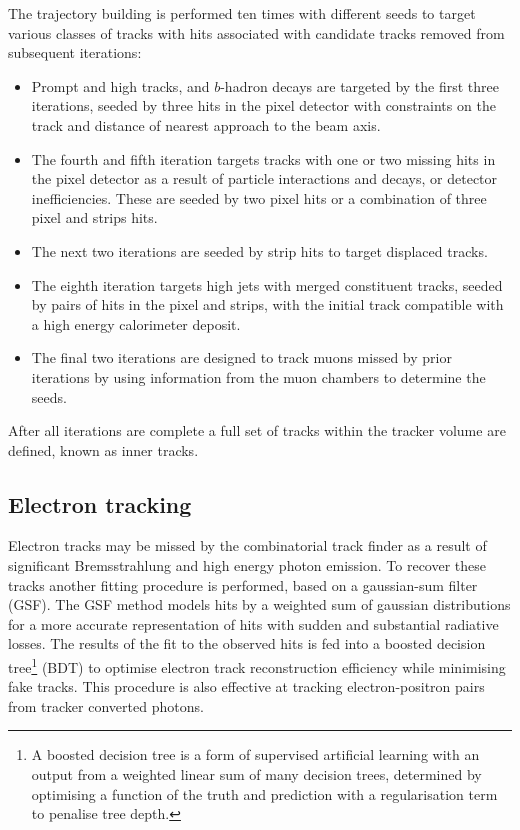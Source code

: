 The trajectory building is performed ten times with different seeds to target
various classes of tracks with hits associated with candidate tracks removed
from subsequent iterations:
\begin{itemize}
    \item Prompt and high \pt tracks, and $b$-hadron decays are targeted by the
    first three iterations, seeded by three hits in the pixel detector with
    constraints on the track \pt and distance of nearest approach to the beam axis.
    \item The fourth and fifth iteration targets tracks with one or two missing
    hits in the pixel detector as a result of particle interactions and
    decays, or detector inefficiencies. These are seeded by two pixel hits or
    a combination of three pixel and strips hits.
    \item The next two iterations are seeded by strip hits to target displaced tracks.
    \item The eighth iteration targets high \pt jets with merged constituent
    tracks, seeded by pairs of hits in the pixel and strips, with the initial
    track compatible with a high energy calorimeter deposit.
    \item The final two iterations are designed to track muons missed by prior
    iterations by using information from the muon chambers to determine the seeds.
\end{itemize}
After all iterations are complete a full set of tracks within the tracker
volume are defined, known as inner tracks.


\subsection{Electron tracking}

Electron tracks may be missed by the combinatorial track finder as a result of
significant Bremsstrahlung and high energy photon emission. To recover these
tracks another fitting procedure is performed, based on a gaussian-sum filter
(GSF). The GSF method models hits by a weighted sum of gaussian distributions
for a more accurate representation of hits with sudden and substantial
radiative losses. The results of the fit to the observed hits is
fed into a boosted decision tree\footnote{A boosted decision tree is a form of
supervised artificial learning with an output from a weighted linear sum of
many decision trees, determined by optimising a function of the truth and
prediction with a regularisation term to penalise tree depth.} (BDT) to
optimise electron track reconstruction efficiency while minimising fake
tracks. This procedure is also effective at tracking electron-positron pairs
from tracker converted photons.


